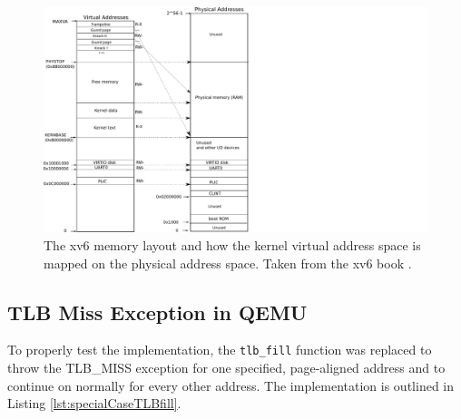 \begin{figure}[t!]
    \centering
    \includegraphics[scale=.5]{figures/xv6_layout.pdf}
    \caption[xv6 memory layout]{The xv6 memory layout and how the kernel virtual address space is mapped on
        the physical address space. Taken from the xv6 book \cite{cox2011xv6}.}
    \label{impl:xv6layout}
\end{figure}


\subsection{TLB Miss Exception in QEMU}


To properly test the implementation, the \texttt{tlb\_fill} function was replaced to throw the
TLB\_MISS exception for
one specified, page-aligned address and to continue on normally for every other address.
The implementation is outlined
in Listing \ref{lst:specialCaseTLBfill}.



